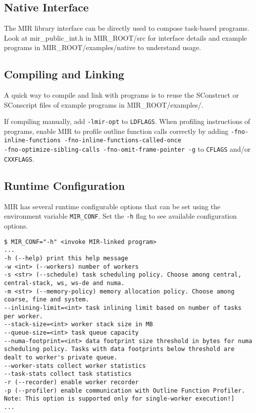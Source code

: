 \documentclass[11pt,a4paper]{article}
\begin{document}
\subsection{Native Interface}\label{native-interface}

The MIR library interface can be directly used to compose task-based programs. Look at mir\_public\_int.h in MIR\_ROOT/src for interface details and example programs in MIR\_ROOT/examples/native to understand usage.

\subsection{Compiling and Linking}\label{compiling-and-linking}

A quick way to compile and link with programs is to reuse the SConstruct or SConscript files of example programs in MIR\_ROOT/examples/.

If compiling manually, add \texttt{-lmir-opt} to \texttt{LDFLAGS}. When profiling instructions of programs, enable MIR to profile outline function calls correctly by adding \texttt{{\footnotesize -fno-inline-functions -fno-inline-functions-called-once \\ -fno-optimize-sibling-calls -fno-omit-frame-pointer -g}}  to \texttt{CFLAGS} and/or \\\texttt{CXXFLAGS}.

\subsection{Runtime Configuration}\label{runtime-configuration}

MIR has several runtime configurable options that can be set using the environment variable \texttt{MIR\_CONF}. Set the \texttt{-h} flag to see available configuration options.

\begin{lstlisting}[style=MyInputStyle]
$ MIR_CONF="-h" <invoke MIR-linked program>
...
-h (--help) print this help message
-w <int> (--workers) number of workers
-s <str> (--schedule) task scheduling policy. Choose among central, central-stack, ws, ws-de and numa.
-m <str> (--memory-policy) memory allocation policy. Choose among coarse, fine and system.
--inlining-limit=<int> task inlining limit based on number of tasks per worker.
--stack-size=<int> worker stack size in MB
--queue-size=<int> task queue capacity
--numa-footprint=<int> data footprint size threshold in bytes for numa scheduling policy. Tasks with data footprints below threshold are dealt to worker's private queue.
--worker-stats collect worker statistics
--task-stats collect task statistics
-r (--recorder) enable worker recorder
-p (--profiler) enable communication with Outline Function Profiler. Note: This option is supported only for single-worker execution!]
...
\end{lstlisting}
\end{document}
